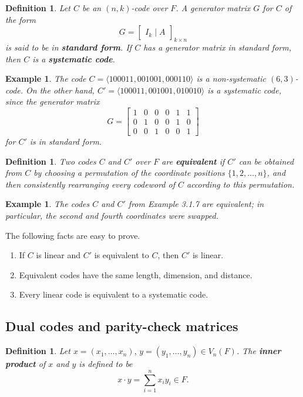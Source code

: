 \documentclass[10pt]{article}
\theoremstyle{newstyle}
\newtheorem{defn}[thm]{Definition}
\newtheorem{exmp}[thm]{Example}
\begin{document}
\begin{defn}
Let $C$ be an $(n, k)$-code over $F$. A generator matrix $G$ for $C$ of the form 
\[ G = \begin{bmatrix} I_k \mid A \end{bmatrix}_{k\times n} \]
is said to be in {\bf standard form}. If $C$ has a generator matrix in standard form, 
then $C$ is a {\bf systematic code}.
\end{defn}

\begin{exmp}
The code $C = \langle 100011, 001001, 000110 \rangle$ is a non-systematic $(6, 3)$-code. 
On the other hand, $C' = \langle 100011, 001001, 010010 \rangle$ is a systematic code, 
since the generator matrix 
\[ G = \begin{bmatrix} 1 & 0 & 0 & 0 & 1 & 1 \\ 0 & 1 & 0 & 0 & 1 & 0 \\ 0 & 0 & 1 & 0 & 0 & 1 
\end{bmatrix} \]
for $C'$ is in standard form.
\end{exmp}

\begin{defn}
Two codes $C$ and $C'$ over $F$ are {\bf equivalent} if $C'$ can be obtained from $C$
by choosing a permutation of the coordinate positions $\{1, 2, \dots, n\}$, and 
then consistently rearranging every codeword of $C$ according to this permutation.
\end{defn}

\begin{exmp}
The codes $C$ and $C'$ from Example 3.1.7 are equivalent; in particular, the 
second and fourth coordinates were swapped.
\end{exmp}

The following facts are easy to prove.
\begin{enumerate}[(1)]
    \item If $C$ is linear and $C'$ is equivalent to $C$, then $C'$ is linear.
    \item Equivalent codes have the same length, dimension, and distance.
    \item Every linear code is equivalent to a systematic code.
\end{enumerate}

\subsection{Dual codes and parity-check matrices}

\begin{defn}
Let $x = (x_1, \dots, x_n),\, y = (y_1, \dots, y_n) \in V_n(F)$. The {\bf inner product} of 
$x$ and $y$ is defined to be 
\[ x \cdot y = \sum_{i=1}^n x_iy_i \in F. \]
\end{defn}
\end{document}
